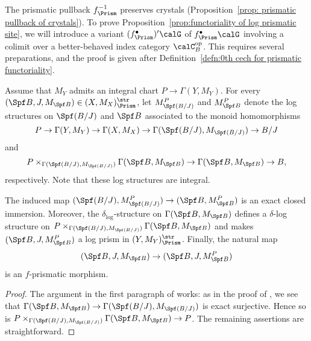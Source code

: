 The prismatic pullback $f_\Prism^{-1}$ preserves crystals (Proposition~\ref{prop: prismatic pullback of crystals}).
To prove Proposition~\ref{prop:functoriality of log prismatic site}, we will introduce a variant $(f_\Prism^\bullet)'\calG$ of $f_\Prism^\bullet\calG$ involving a colimit over a better-behaved index category $\calC_B^\mathrm{op}$. This requires several preparations, and the proof is given after Definition~\ref{defn:0th cech for prismatic functoriality}.

Assume that $M_Y$ admits an integral chart $P\rightarrow \Gamma(Y,M_Y)$. For every $(\Spf B, J, M_{\Spf B})\in (X,M_X)_\Prism^{\str}$, let $M_{\Spf (B/J)}^P$ and $M_{\Spf B}^P$ denote the log structures on $\Spf(B/J)$ and $\Spf B$ associated to
the monoid homomorphisms
\[
P\rightarrow \Gamma(Y,M_Y) \rightarrow \Gamma(X,M_X)\rightarrow \Gamma(\Spf (B/J), M_{\Spf (B/J)}) \rightarrow B/J
\]
and 
\[
P\times_{\Gamma(\Spf (B/J), M_{\Spf (B/J)})}\Gamma(\Spf B, M_{\Spf B})\rightarrow \Gamma(\Spf B, M_{\Spf B}) \rightarrow B,
\]
respectively. Note that these log structures are integral.


\begin{lem}\label{lem:f-prismatic morphism induced by chart}
The induced map $(\Spf (B/J), M_{\Spf (B/J)}^P)\rightarrow (\Spf B, M_{\Spf B}^P)$ is an exact closed immersion. Moreover, the $\delta_\log$-structure on $\Gamma(\Spf B, M_{\Spf B})$ defines a $\delta$-log structure on $P\times_{\Gamma(\Spf (B/J), M_{\Spf (B/J)})}\Gamma(\Spf B, M_{\Spf B})$ and makes $(\Spf B, J, M_{\Spf B}^P)$ a log prism in $(Y,M_Y)_\Prism^{\str}$. Finally, the natural map
\[
(\Spf B, J, M_{\Spf B})\rightarrow (\Spf B, J, M_{\Spf B}^P)
\]
is an $f$-prismatic morphism.
\end{lem}


\begin{proof}
    The argument in the first paragraph of \cite[Prop.~3.7]{koshikawa} works: as in the proof of \cite[Lem.~3.8]{koshikawa}, we see that $\Gamma(\Spf B, M_{\Spf B})\rightarrow \Gamma(\Spf (B/J), M_{\Spf (B/J)})$ is exact surjective. Hence so is $P\times_{\Gamma(\Spf (B/J), M_{\Spf (B/J)})}\Gamma(\Spf B, M_{\Spf B})\rightarrow P$. The remaining assertions are straightforward.
\end{proof}

